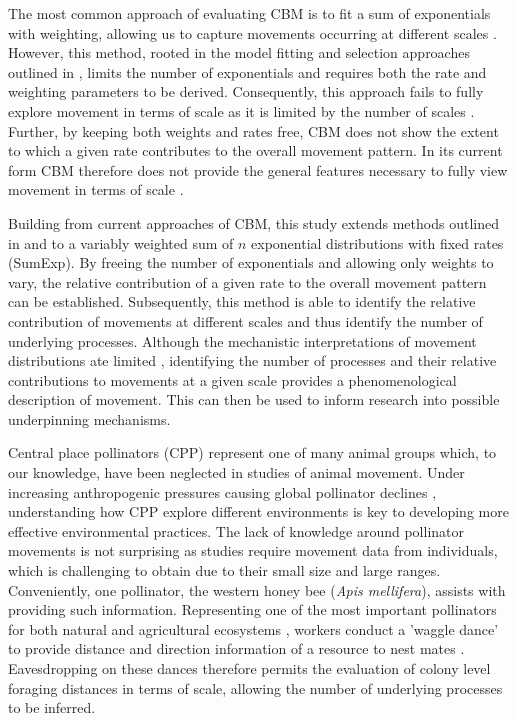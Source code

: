 \documentclass[11pt,usenames,dvipsnames,a4paper]{article}
\begin{document}
\begin{linenumbers}
The most common approach of evaluating CBM is to fit a sum of exponentials with weighting, allowing us to capture movements occurring at different scales \citep{Jansen2012, DeJager2013, Kolzsch2015, Wosniack2017}. However, this method, rooted in the model fitting and selection approaches outlined in \cite{Murphy2007}, limits the number of exponentials and requires both the rate and weighting parameters to be derived. Consequently, this approach fails to fully explore movement in terms of scale as it is limited by the number of scales \citep{Jansen2012}. Further, by keeping both weights and rates free, CBM does not show the extent to which a given rate contributes to the overall movement pattern. In its current form CBM therefore does not provide the general features necessary to fully view movement in terms of scale \citep{Nathan2008, Patterson2017}. 

Building from current approaches of CBM, this study extends methods outlined in \cite{Petrovskii2011} and \cite{Jansen2012} to a variably weighted sum of $n$ exponential distributions with fixed rates (SumExp). By freeing the number of exponentials and allowing only weights to vary, the relative contribution of a given rate to the overall movement pattern can be established. Subsequently, this method is able to identify the relative contribution of movements at different scales and thus identify the number of underlying processes. Although the mechanistic interpretations of movement distributions ate limited \citep{Bearup2016}, identifying the number of processes and their relative contributions to movements at a given scale provides a phenomenological description of movement. This can then be used to inform research into possible underpinning mechanisms. 

Central place pollinators (CPP) represent one of many animal groups which, to our knowledge, have been neglected in studies of animal movement. Under increasing anthropogenic pressures causing global pollinator declines \citep{Powney2019}, understanding how CPP explore different environments is key to developing more effective environmental practices. The lack of knowledge around pollinator movements is not surprising as studies require movement data from individuals, which is challenging to obtain due to their small size and large ranges. Conveniently, one pollinator, the western honey bee (\textit{Apis mellifera}), assists with providing such information. Representing one of the most important pollinators for both natural and agricultural ecosystems \citep{Albrecht2018}, workers conduct a 'waggle dance' to provide distance and direction information of a resource to nest mates \citep{Seeley1995}. Eavesdropping on these dances therefore permits the evaluation of colony level foraging distances in terms of scale, allowing the number of underlying processes to be inferred.


\end{linenumbers}
\end{document}
